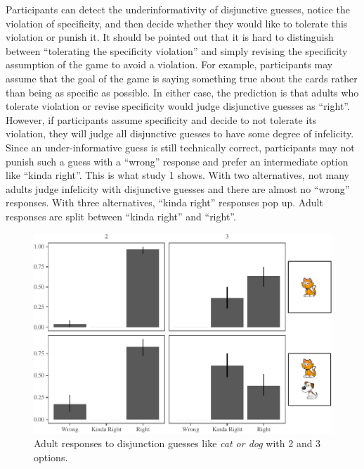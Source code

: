 \documentclass[floatsintext,man]{apa6}
\theoremstyle{definition}
\theoremstyle{definition}
\theoremstyle{definition}
\theoremstyle{remark}
\begin{document}
Participants can detect the underinformativity of disjunctive guesses,
notice the violation of specificity, and then decide whether they would
like to tolerate this violation or punish it. It should be pointed out
that it is hard to distinguish between \enquote{tolerating the
specificity violation} and simply revising the specificity assumption of
the game to avoid a violation. For example, participants may assume that
the goal of the game is saying something true about the cards rather
than being as specific as possible. In either case, the prediction is
that adults who tolerate violation or revise specificity would judge
disjunctive guesses as \enquote{right}. However, if participants assume
specificity and decide to not tolerate its violation, they will judge
all disjunctive guesses to have some degree of infelicity. Since an
under-informative guess is still technically correct, participants may
not punish such a guess with a \enquote{wrong} response and prefer an
intermediate option like \enquote{kinda right}. This is what study 1
shows. With two alternatives, not many adults judge infelicity with
disjunctive guesses and there are almost no \enquote{wrong} responses.
With three alternatives, \enquote{kinda right} responses pop up. Adult
responses are split between \enquote{kinda right} and \enquote{right}.

\begin{figure}
\centering
\includegraphics{figs/implicaturePlot-1.pdf}
\caption{\label{fig:implicaturePlot}Adult responses to disjunction guesses
like \textit{cat or dog} with 2 and 3 options.}
\end{figure}
\end{document}
